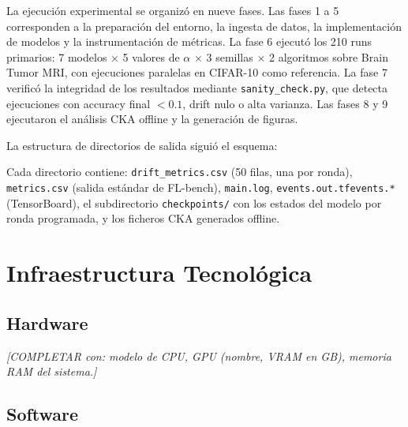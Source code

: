 La ejecución experimental se organizó en nueve fases. Las fases 1 a 5 corresponden a la
preparación del entorno, la ingesta de datos, la implementación de modelos y la
instrumentación de métricas. La fase 6 ejecutó los 210 runs primarios: 7 modelos × 5 valores
de $\alpha$ × 3 semillas × 2 algoritmos sobre Brain Tumor MRI, con ejecuciones paralelas en
CIFAR-10 como referencia. La fase 7 verificó la integridad de los resultados mediante
\texttt{sanity\_check.py}, que detecta ejecuciones con accuracy final $< 0.1$, drift nulo o
alta varianza. Las fases 8 y 9 ejecutaron el análisis CKA offline y la generación de figuras.

La estructura de directorios de salida siguió el esquema:
\begin{center}
\end{center}

Cada directorio contiene: \texttt{drift\_metrics.csv} (50 filas, una por ronda),
\texttt{metrics.csv} (salida estándar de FL-bench), \texttt{main.log},
\texttt{events.out.tfevents.*} (TensorBoard), el subdirectorio \texttt{checkpoints/} con
los estados del modelo por ronda programada, y los ficheros CKA generados offline.

\section{Infraestructura Tecnológica}

\subsection{Hardware}

\textit{[COMPLETAR con: modelo de CPU, GPU (nombre, VRAM en GB), memoria RAM del sistema.]}

\subsection{Software}

